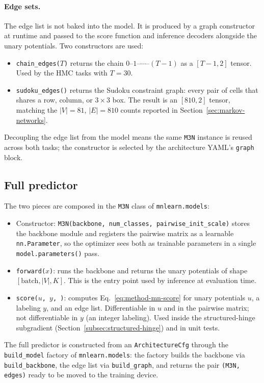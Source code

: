 \paragraph{Edge sets.}
The edge list is not baked into the model. It is produced by a
graph constructor at runtime and passed to the score function
and inference decoders alongside the unary potentials. Two
constructors are used:
\begin{itemize}
    \item \texttt{chain\_edges($T$)} returns the chain
    $0\text{--}1\text{--}\cdots\text{--}(T - 1)$ as a
    $[T - 1, 2]$ tensor. Used by the HMC tasks with
    $T = 30$.
    \item \texttt{sudoku\_edges()} returns the Sudoku
    constraint graph: every pair of cells that shares a row,
    column, or $3 \times 3$ box. The result is an $[810, 2]$
    tensor, matching the $|V| = 81$, $|E| = 810$ counts
    reported in Section~\ref{sec:markov-networks}.
\end{itemize}
Decoupling the edge list from the model means the same
\texttt{M3N} instance is reused across both tasks; the
constructor is selected by the architecture YAML's
\texttt{graph} block.

\subsection{Full predictor}
\label{subsec:method-architecture-full}

The two pieces are composed in the \texttt{M3N} class of
\texttt{mnlearn.models}:
\begin{itemize}
    \item Constructor:
    \texttt{M3N(backbone, num\_classes, pairwise\_init\_scale)}
    stores the backbone module and registers the pairwise
    matrix as a learnable \texttt{nn.Parameter}, so the
    optimizer sees both as trainable parameters in a single
    \texttt{model.parameters()} pass.
    \item \texttt{forward($x$)}: runs the backbone and returns
    the unary potentials of shape $[\mathrm{batch}, |V|, K]$.
    This is the entry point used by inference at evaluation
    time.
    \item \texttt{score($u$, $y$, )}: computes
    Eq.~\eqref{eq:method-mn-score} for unary potentials $u$, a
    labeling $y$, and an edge list. Differentiable in $u$
    and in the pairwise matrix; not differentiable in $y$ (an
    integer labeling). Used inside the structured-hinge
    subgradient (Section~\ref{subsec:structured-hinge}) and in
    unit tests.
\end{itemize}

The full predictor is constructed from an
\texttt{ArchitectureCfg} through the \texttt{build\_model}
factory of \texttt{mnlearn.models}: the factory builds the
backbone via \texttt{build\_backbone}, the edge list via
\texttt{build\_graph}, and returns the pair
\texttt{(M3N, edges)} ready to be moved to the training device.